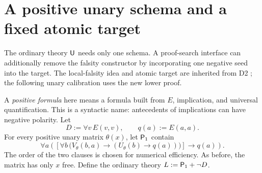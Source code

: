 \section{A positive unary schema and a fixed atomic target}
\label{sec:positive}

The ordinary theory $\mathsf{U}$ needs only one schema. A proof-search interface can additionally remove the falsity constructor by incorporating one negative seed into the target. The local-falsity idea and atomic target are inherited from D2 \cite{draftLocal}; the following unary calibration uses the new lower proof.

A \emph{positive formula} here means a formula built from $E$, implication, and universal quantification. This is a syntactic name: antecedents of implications can have negative polarity. Let
\[
 D:=\forall v\,E(v,v),\qquad q(a):=E(a,a).
\]
For every positive unary matrix $\theta(x)$, let $\mathsf{P}_{1}$ contain
\begin{equation}\label{eq:positive-unary}\tag{P}
 \forall a\left(\left[\forall b\,
       \bigl(V_\theta(b,a)\to(U_\theta(b)\to q(a))\bigr)\right]
                                                  \to q(a)\right).
\end{equation}
The order of the two clauses is chosen for numerical efficiency. As before, the matrix has only $x$ free. Define the ordinary theory
\(L:=\mathsf{P}_{1}+\neg D\).

